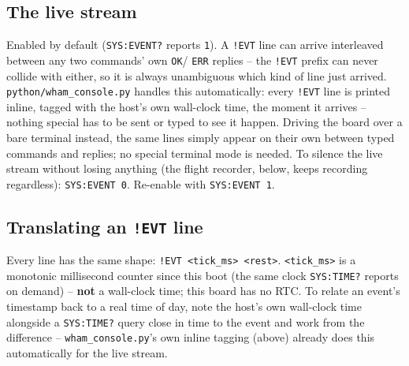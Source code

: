 \documentclass[11pt]{article}
\newcommand{\code}[1]{\texttt{#1}}
\begin{document}
\subsection{The live stream}

Enabled by default (\code{SYS:EVENT?} reports \code{1}). A \code{!EVT}
line can arrive interleaved between any two commands' own \code{OK}/
\code{ERR} replies -- the \code{!EVT} prefix can never collide with
either, so it is always unambiguous which kind of line just arrived.
\code{python/wham\_console.py} handles this automatically: every
\code{!EVT} line is printed inline, tagged with the host's own
wall-clock time, the moment it arrives -- nothing special has to be
sent or typed to see it happen. Driving the board over a bare terminal
instead, the same lines simply appear on their own between typed
commands and replies; no special terminal mode is needed. To silence
the live stream without losing anything (the flight recorder, below,
keeps recording regardless): \code{SYS:EVENT 0}. Re-enable with
\code{SYS:EVENT 1}.

\subsection{Translating an \code{!EVT} line}

Every line has the same shape: \code{!EVT <tick\_ms> <rest>}.
\code{<tick\_ms>} is a monotonic millisecond counter since this boot
(the same clock \code{SYS:TIME?} reports on demand) -- \textbf{not} a
wall-clock time; this board has no RTC. To relate an event's timestamp
back to a real time of day, note the host's own wall-clock time
alongside a \code{SYS:TIME?} query close in time to the event and work
from the difference -- \code{wham\_console.py}'s own inline tagging
(above) already does this automatically for the live stream.
\end{document}
